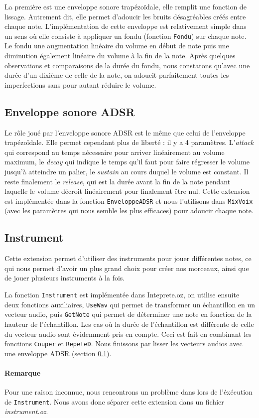 \documentclass[a4paper,oneside,10pt]{article}
\newcommand{\fun}[1]{\texttt{#1}}
\begin{document}
La première est une enveloppe sonore trapézo\"idale, elle remplit une fonction de lissage.
Autrement dit, elle permet d'adoucir les bruits désagréables créés entre chaque note.
L'implémentation de cette enveloppe est relativement simple dans 
un sens où elle consiste à appliquer un fondu (fonction \fun{Fondu}) sur chaque note. 
Le fondu une augmentation linéaire du volume en début de note puis 
une diminution également linéaire du volume à la fin de la note. 
Après quelques observations et comparaisons de la durée du fondu, 
nous constatons qu'avec une durée d'un dixième de celle de la note, 
on adoucit parfaitement toutes les imperfections sans pour autant 
réduire le volume.


\subsection{Enveloppe sonore ADSR}
\label{subsec:adsr}

Le rôle joué par l'enveloppe sonore ADSR est le même que celui de l'enveloppe trapézo\"idale. 
Elle permet cependant plus de liberté : il y a 4 paramètres. 
L'\emph{attack} qui correspond au temps nécessaire pour arriver linéairement 
au volume maximum, le \emph{decay} qui indique le temps qu'il faut pour faire régresser 
le volume jusqu'à atteindre un palier, le \emph{sustain} au cours duquel le volume est constant. 
Il reste finalement le \emph{release}, qui est la durée avant la fin de la note pendant laquelle 
le volume décroit linéairement pour finalement être nul.
Cette extension est implémentée dans la fonction \fun{EnveloppeADSR} 
et nous l'utilisons dans \fun{MixVoix} (avec les paramètres qui nous semble les plus 
efficaces) pour adoucir chaque note.


\subsection{Instrument}

Cette extension permet d'utiliser des instruments pour jouer différentes notes, 
ce qui nous permet d'avoir un plus grand choix pour créer nos morceaux, 
ainsi que de jouer plusieurs instruments à la fois. 

La fonction \fun{Instrument} est implémentée dans Inteprete.oz, 
on utilise ensuite deux fonctions auxiliaires, \fun{UseWav} qui permet 
de transformer un échantillon en un vecteur audio, puis \fun{GetNote} qui permet 
de déterminer une note en fonction de la hauteur de l'échantillon. 
Les cas où la durée de l'échantillon est différente de celle du vecteur audio 
sont évidemment pris en compte.
Ceci est fait en combinant les fonctions \fun{Couper} et \fun{RepeteD}. 
Nous finissons par lisser les vecteurs audios avec une enveloppe ADSR (section \ref{subsec:adsr}).

\paragraph{Remarque}
Pour une raison inconnue, nous rencontrons un problème dans lors de l'éxécution de \fun{Instrument}.
Nous avons donc séparer cette extension dans un fichier \textit{instrument.oz}.
\end{document}
